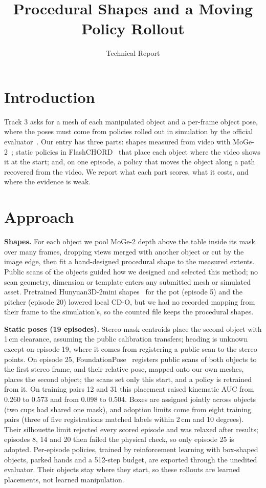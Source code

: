 \documentclass[10pt, logo, copyright, anonymous]{nvidiaextabstract}
\subtitle{Technical Report}
\title{Procedural Shapes and a Moving Policy Rollout}
\begin{document}
\raggedbottom
\maketitle
\setlength{\parskip}{0.20\baselineskip}

\section{Introduction}
Track 3 asks for a mesh of each manipulated object and a per-frame object
pose, where the poses must come from policies rolled out in simulation by
the official evaluator~\cite{challenge,faq}. Our entry has three parts:
shapes measured from video with MoGe-2~\cite{moge2}; static policies in
FlashCHORD~\cite{flashchord} that place each object where the video shows it
at the start; and, on one episode, a policy that moves the object along a
path recovered from the video. We report what each part scores, what it
costs, and where the evidence is weak.

\section{Approach}
\textbf{Shapes.} For each object we pool MoGe-2 depth above the table
inside its mask over many frames, dropping views merged with another object
or cut by the image edge, then fit a hand-designed procedural shape to the
measured extents. Public scans of the objects guided how we
designed and selected this method; no scan geometry, dimension or template
enters any submitted mesh or simulated asset. Pretrained Hunyuan3D-2mini
shapes~\cite{hunyuan3d2} for the pot (episode 5) and the pitcher
(episode 20) lowered local CD-O, but we had no recorded mapping from their
frame to the simulation's, so the counted file keeps the procedural shapes.

\textbf{Static poses (19 episodes).} Stereo mask centroids place the
second object with 1\,cm clearance, assuming the public calibration
transfers; heading is unknown except on episode 19, where it comes from
registering a public scan to the stereo points. On episode 25,
FoundationPose~\cite{foundationpose} registers public scans of both objects to
the first stereo frame, and their relative pose, mapped onto our own meshes,
places the second object; the scans set only this start, and a policy is
retrained from it. On training pairs 12 and 31 this placement raised kinematic
AUC from 0.260 to 0.573 and from 0.098 to 0.504. Boxes are assigned jointly
across objects (two cups had shared one mask), and adoption limits come from
eight training pairs (three of five registrations matched labels within 2\,cm
and 10 degrees). Their silhouette limit rejected every scored episode and was
relaxed after results; episodes 8, 14 and 20 then failed the physical check,
so only episode 25 is adopted. Per-episode policies,
trained by reinforcement learning with box-shaped objects, parked hands and
a 512-step budget, are exported through the unedited evaluator. Their objects stay where they start, so these rollouts
are learned placements, not learned manipulation.
\end{document}
